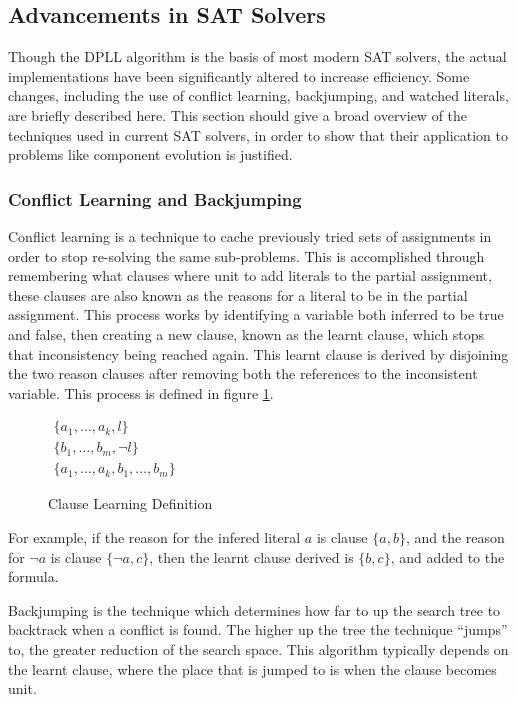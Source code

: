 \subsection{Advancements in SAT Solvers}
Though the DPLL algorithm is the basis of most modern SAT solvers, the actual implementations have been significantly altered to increase efficiency.
Some changes, including the use of conflict learning, backjumping, and watched literals, are briefly described here.
This section should give a broad overview of the techniques used in current SAT solvers, 
in order to show that their application to problems like component evolution is justified. 

\subsubsection{Conflict Learning and Backjumping}
Conflict learning \citep{stallman1976} is a technique to cache previously tried sets of assignments in order to stop re-solving the same sub-problems.
This is accomplished through remembering what clauses where unit to add literals to the partial assignment, 
these clauses are also known as the reasons for a literal to be in the partial assignment.
This process works by identifying a variable both inferred to be true and false,
then creating a new clause, known as the learnt clause, which stops that inconsistency being reached again.
This learnt clause is derived by disjoining the two reason clauses after removing both the references to the inconsistent variable.
This process is defined in figure \ref{impl.clauselearning}. 

\begin{figure}[htp]
\begin{center}
$\begin{array}{c}
\{a_1,\ldots,a_k, l\} \\
\{b_1,\ldots,b_m,\neg l\}\\
\hline
\{a_1,\ldots,a_k, b_1,\ldots,b_m \}
\end{array}$
  \caption{Clause Learning Definition}
  \label{impl.clauselearning}
\end{center}
\end{figure}

For example, if the reason for the infered literal $a$ is clause $\{a, b\}$, and the reason for $\neg a$ is clause $\{\neg a, c\}$,
then the learnt clause derived is $\{b,c\}$, and added to the formula.

Backjumping \citep{Gaschnig1979} is the technique which determines how far to up the search tree to backtrack when a conflict is found.
The higher up the tree the technique ``jumps'' to, the greater reduction of the search space.
This algorithm typically depends on the learnt clause, where the place that is jumped to is when the clause becomes unit. 

